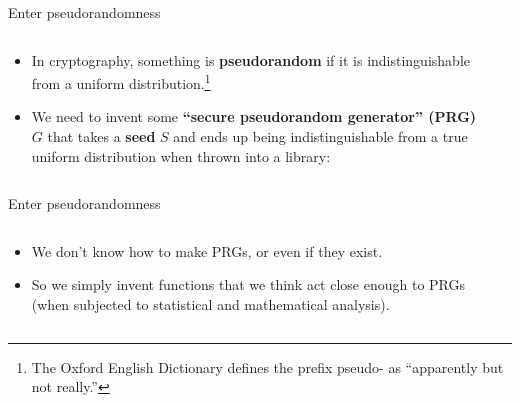 \documentclass[aspectratio=169, lualatex, handout]{beamer}
\begin{document}
\begin{frame}{Enter pseudorandomness}
	\begin{columns}[c]
		\begin{column}{0.5\textwidth}
			\begin{itemize}[<+->]
				\item In cryptography, something is \textbf{pseudorandom} if it is indistinguishable from a uniform distribution.\footnote{The Oxford English Dictionary defines the prefix pseudo- as ``apparently but not really.''}
				\item We need to invent some \textbf{``secure pseudorandom generator'' (PRG)} $G$ that takes a \textbf{seed} $S$ and ends up being indistinguishable from a true uniform distribution when thrown into a library:
			\end{itemize}
		\end{column}
		\begin{column}{0.5\textwidth}
		\end{column}
	\end{columns}
\end{frame}

\begin{frame}{Enter pseudorandomness}
	\begin{columns}[c]
		\begin{column}{0.5\textwidth}
			\begin{itemize}[<+->]
				\item We don't know how to make PRGs, or even if they exist.
				\item So we simply invent functions that we think act close enough to PRGs (when subjected to statistical and mathematical analysis).
			\end{itemize}
		\end{column}
		\begin{column}{0.5\textwidth}
		\end{column}
	\end{columns}
\end{frame}
\end{document}
